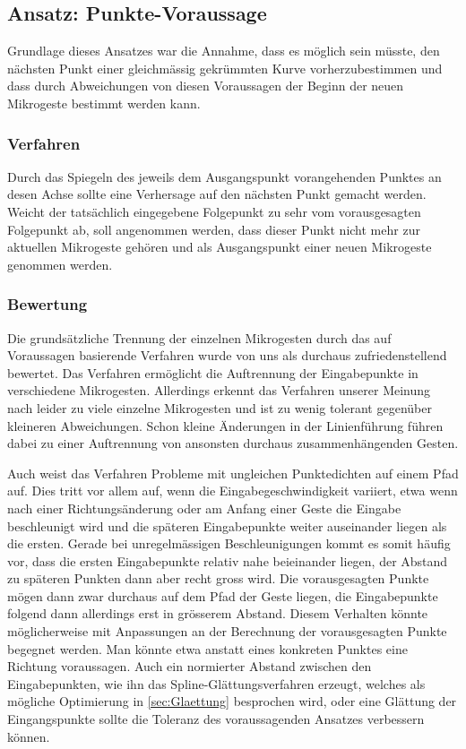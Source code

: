 \subsection{Ansatz: Punkte-Voraussage}
Grundlage dieses Ansatzes war die Annahme, dass es möglich sein müsste, den nächsten Punkt einer gleichmässig gekrümmten Kurve vorherzubestimmen und dass durch Abweichungen von diesen Voraussagen der Beginn der neuen Mikrogeste bestimmt werden kann.

\subsubsection{Verfahren}
Durch das Spiegeln des jeweils dem Ausgangspunkt vorangehenden Punktes an desen Achse sollte eine Verhersage auf den nächsten Punkt gemacht werden. Weicht der tatsächlich eingegebene Folgepunkt zu sehr vom vorausgesagten Folgepunkt ab, soll angenommen werden, dass dieser Punkt nicht mehr zur aktuellen Mikrogeste gehören und als Ausgangspunkt einer neuen Mikrogeste genommen werden.

\subsubsection{Bewertung}
Die grundsätzliche Trennung der einzelnen Mikrogesten durch das auf Voraussagen basierende Verfahren wurde von uns als durchaus zufriedenstellend bewertet. Das Verfahren ermöglicht die Auftrennung der Eingabepunkte in verschiedene Mikrogesten. Allerdings erkennt das Verfahren unserer Meinung nach leider zu viele einzelne Mikrogesten und ist zu wenig tolerant gegenüber kleineren Abweichungen. Schon kleine Änderungen in der Linienführung führen dabei zu einer Auftrennung von ansonsten durchaus zusammenhängenden Gesten.

Auch weist das Verfahren Probleme mit ungleichen Punktedichten auf einem Pfad auf. Dies tritt vor allem auf, wenn die Eingabegeschwindigkeit variiert, etwa wenn nach einer Richtungsänderung oder am Anfang einer Geste die Eingabe beschleunigt wird und die späteren Eingabepunkte weiter auseinander liegen als die ersten. Gerade bei unregelmässigen Beschleunigungen kommt es somit häufig vor, dass die ersten Eingabepunkte relativ nahe beieinander liegen, der Abstand zu späteren Punkten dann aber recht gross wird. Die vorausgesagten Punkte mögen dann zwar durchaus auf dem Pfad der Geste liegen, die Eingabepunkte folgend dann allerdings erst in grösserem Abstand. Diesem Verhalten könnte möglicherweise mit Anpassungen an der Berechnung der vorausgesagten Punkte begegnet werden. Man könnte etwa anstatt eines konkreten Punktes eine Richtung voraussagen. Auch ein normierter Abstand zwischen den Eingabepunkten, wie ihn das Spline-Glättungsverfahren erzeugt, welches als mögliche Optimierung in \ref{sec:Glaettung} besprochen wird, oder eine Glättung der Eingangspunkte sollte die Toleranz des voraussagenden Ansatzes verbessern können.

